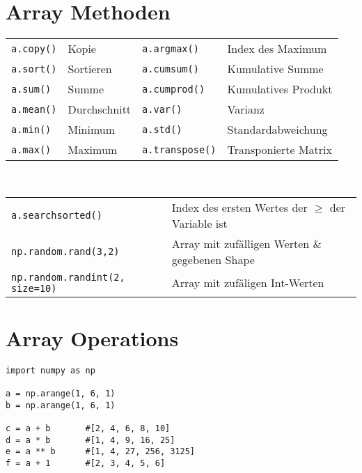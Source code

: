 \section{Array Methoden}
\begin{tabular}{lp{4cm}lp{4cm}}
\texttt{a.copy()}		&Kopie		&\texttt{a.argmax()}		&Index des Maximum\\
\texttt{a.sort()}		&Sortieren	&\texttt{a.cumsum()}	&Kumulative Summe\\
\texttt{a.sum()}		&Summe		&\texttt{a.cumprod()}	&Kumulatives Produkt\\
\texttt{a.mean()}	&Durchschnitt	&\texttt{a.var()}			&Varianz\\
\texttt{a.min()}		&Minimum	&\texttt{a.std()}			&Standardabweichung\\
\texttt{a.max()}		&Maximum	&\texttt{a.transpose()}	&Transponierte Matrix\\
\end{tabular}\\[0.5em]
\begin{tabular}{lp{10cm}}
\texttt{a.searchsorted()}	&Index des ersten Wertes der $\geq$ der Variable ist\\
\texttt{np.random.rand(3,2)}	&Array mit zufälligen Werten \& gegebenen Shape\\
\texttt{np.random.randint(2, size=10)}	&Array mit zufäligen Int-Werten\\
\end{tabular}
\section{Array Operations}
\begin{lstlisting}
import numpy as np

a = np.arange(1, 6, 1)
b = np.arange(1, 6, 1)

c = a + b 		#[2, 4, 6, 8, 10]
d = a * b 		#[1, 4, 9, 16, 25]
e = a ** b 		#[1, 4, 27, 256, 3125]
f = a + 1		#[2, 3, 4, 5, 6]

\end{lstlisting}

